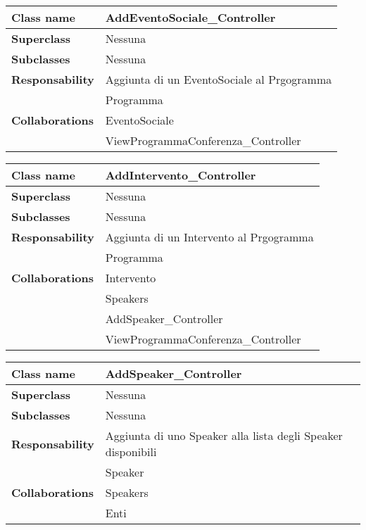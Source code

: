 \begin{table}[h!]
	\begin{tabular}{|l|l|}
		\hline 
		\textbf{Class name} & AddEventoSociale\_Controller
		\\ \hline
		\textbf{Superclass} & Nessuna
		\\ \hline
		\multirow{1}{*}{\textbf{Subclasses}} & Nessuna
		\\ \hline
		\textbf{Responsability} & Aggiunta di un EventoSociale al Prgogramma
		\\ \hline
		\multirow{3}{*}{\textbf{Collaborations}} & Programma \\
		& EventoSociale\\
		& ViewProgrammaConferenza\_Controller
		\\ \hline
	\end{tabular}
\end{table}

\begin{table}[h!]
	\begin{tabular}{|l|l|}
		\hline 
		\textbf{Class name} & AddIntervento\_Controller
		\\ \hline
		\textbf{Superclass} & Nessuna
		\\ \hline
		\multirow{1}{*}{\textbf{Subclasses}} & Nessuna
		\\ \hline
		\textbf{Responsability} & Aggiunta di un Intervento al Prgogramma
		\\ \hline
		\multirow{3}{*}{\textbf{Collaborations}} & Programma \\
		& Intervento\\
		& Speakers\\
		& AddSpeaker\_Controller\\
		& ViewProgrammaConferenza\_Controller
		\\ \hline
	\end{tabular}
\end{table}

\begin{table}[h!]
	\begin{tabular}{|l|l|}
		\hline 
		\textbf{Class name} & AddSpeaker\_Controller
		\\ \hline
		\textbf{Superclass} & Nessuna
		\\ \hline
		\multirow{1}{*}{\textbf{Subclasses}} & Nessuna
		\\ \hline
		\textbf{Responsability} & Aggiunta di uno Speaker alla lista degli Speaker disponibili
		\\ \hline
		\multirow{3}{*}{\textbf{Collaborations}} & Speaker \\
		& Speakers\\
		& Enti
		\\ \hline
	\end{tabular}
\end{table}

